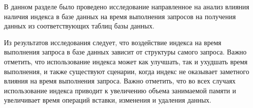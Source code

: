 В данном разделе было проведено исследование направленное на анализ влияния наличия индекса в базе данных на время выполнения запросов на получения данных из соответствующих таблиц базы данных.

Из результатов исследования следует, что воздействие индекса на время выполнения запроса в базе данных зависит от структуры самого запроса. 
Важно отметить, что использование индекса может как улучшать, так и ухудшать время выполнения, и также существуют сценарии, когда индекс не оказывает заметного влияния на время выполнения запроса.
Важно отметить, что во всех случаях использование индекса приводит к увеличению объема занимаемой памяти и увеличивает время операций вставки, изменения и удаления данных.